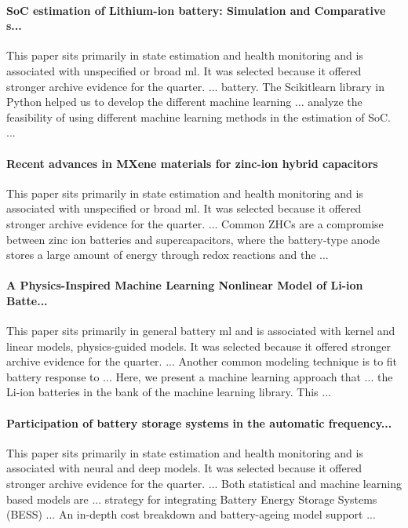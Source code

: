 \documentclass[conference]{IEEEtran}
\begin{document}
\paragraph{SoC estimation of Lithium-ion battery: Simulation and Comparative s...} This paper sits primarily in state estimation and health monitoring and is associated with unspecified or broad ml. It was selected because it offered stronger archive evidence for the quarter. ... battery. The Scikitlearn library in Python helped us to develop the different machine learning ... analyze the feasibility of using different machine learning methods in the estimation of SoC. ... \cite{socestimationof2023}

\paragraph{Recent advances in MXene materials for zinc-ion hybrid capacitors} This paper sits primarily in state estimation and health monitoring and is associated with unspecified or broad ml. It was selected because it offered stronger archive evidence for the quarter. ... Common ZHCs are a compromise between zinc ion batteries and supercapacitors, where the battery-type anode stores a large amount of energy through redox reactions and the ... \cite{recentadvancesin2025}

\paragraph{A Physics-Inspired Machine Learning Nonlinear Model of Li-ion Batte...} This paper sits primarily in general battery ml and is associated with kernel and linear models, physics-guided models. It was selected because it offered stronger archive evidence for the quarter. ... Another common modeling technique is to fit battery response to ... Here, we present a machine learning approach that ... the Li-ion batteries in the bank of the machine learning library. This ... \cite{aphysicsinspired2023}

\paragraph{Participation of battery storage systems in the automatic frequency...} This paper sits primarily in state estimation and health monitoring and is associated with neural and deep models. It was selected because it offered stronger archive evidence for the quarter. ... Both statistical and machine learning based models are ... strategy for integrating Battery Energy Storage Systems (BESS) ... An in-depth cost breakdown and battery-ageing model support ... \cite{participationofbattery2020}
\end{document}
